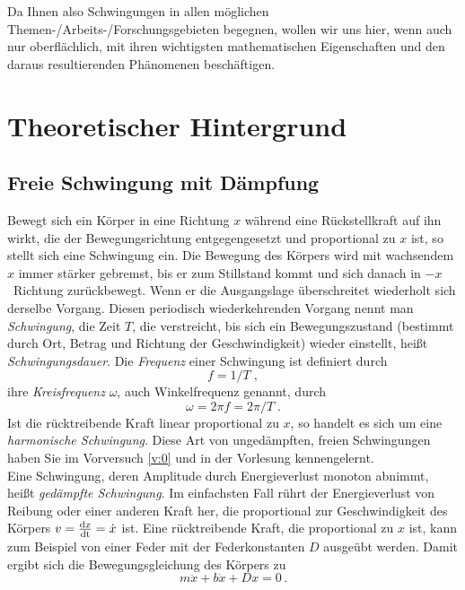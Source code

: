 \noindent
Da Ihnen also Schwingungen in allen möglichen Themen-/Arbeits-/Forschungsgebieten begegnen, wollen wir uns hier, wenn auch nur oberflächlich, mit ihren wichtigsten mathematischen Eigenschaften und den daraus resultierenden Phänomenen beschäftigen.
%
\section{Theoretischer Hintergrund}

\subsection{Freie Schwingung mit Dämpfung}

Bewegt sich ein Körper in eine Richtung $x$ während eine Rückstellkraft auf ihn wirkt, die der Bewegungsrichtung entgegengesetzt und proportional zu $x$ ist, so stellt sich eine Schwingung ein. Die Bewegung des  Körpers wird mit wachsendem $x$ immer stärker gebremst, bis er zum Stillstand kommt und sich danach in $-x$~Richtung zurückbewegt. Wenn er die Ausgangslage überschreitet wiederholt sich derselbe Vorgang. Diesen periodisch wiederkehrenden Vorgang nennt man \textit{Schwingung}, die Zeit $T$, die verstreicht, bis sich ein Bewegungszustand (bestimmt durch Ort, Betrag und Richtung der Geschwindigkeit) wieder einstellt, heißt \textit{Schwingungsdauer}. Die \textit{Frequenz} einer Schwingung ist definiert durch
\begin{equation}
f = 1/T \; ,
\end{equation}
ihre \textit{Kreisfrequenz} $\omega$, auch Winkelfrequenz genannt, durch
\begin{equation}
\omega = 2\pi f = 2\pi /T\; .
\end{equation}
%
Ist die rücktreibende Kraft linear proportional zu $x$, so handelt es sich um eine \textit{harmonische Schwingung}. Diese Art von ungedämpften, freien Schwingungen haben Sie im Vorversuch \ref{v:0} und in der Vorlesung kennengelernt.\\
Eine Schwingung, deren Amplitude durch Energieverlust monoton abnimmt, heißt \textit{gedämpfte Schwingung}. Im einfachsten Fall rührt der Energieverlust von Reibung oder einer anderen Kraft her, die proportional zur Geschwindigkeit des Körpers $v = \frac{{\rm d} x}{\rm dt} = \dot{x}$ ist. Eine rücktreibende Kraft, die proportional zu $x$ ist, kann zum Beispiel von einer Feder mit der Federkonstanten $D$ ausgeübt werden. Damit ergibt sich die Bewegungsgleichung des Körpers zu
\begin{equation}
	m\ddot{x} + b\dot{x} + Dx = 0 \, .
\label{eq:Schwingungsgleichung_vn1}
\end{equation}

